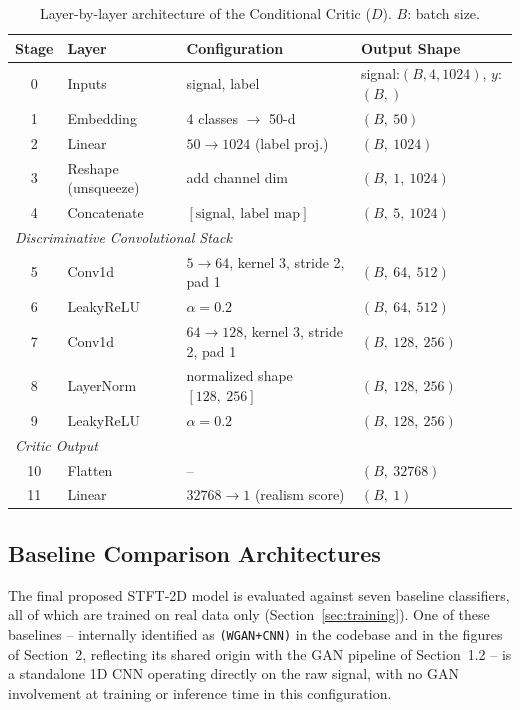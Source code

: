 \documentclass[12pt]{article}
\begin{document}
\begin{table}[H]
\centering
\caption{Layer-by-layer architecture of the Conditional Critic ($D$). $B$: batch size.}
\label{tab:critic}
\begin{tabular}{@{}clll@{}}
\toprule
\textbf{Stage} & \textbf{Layer} & \textbf{Configuration} & \textbf{Output Shape} \\
\midrule
0 & Inputs & signal, label & signal:$(B,4,1024)$, $y$:$(B,)$ \\
1 & Embedding & 4 classes $\to$ 50-d & $(B,\ 50)$ \\
2 & Linear & $50 \to 1024$ (label proj.) & $(B,\ 1024)$ \\
3 & Reshape (unsqueeze) & add channel dim & $(B,\ 1,\ 1024)$ \\
4 & Concatenate & $[\text{signal},\ \text{label map}]$ & $(B,\ 5,\ 1024)$ \\
\midrule
\multicolumn{4}{l}{\textit{Discriminative Convolutional Stack}} \\
5 & Conv1d & $5{\to}64$, kernel 3, stride 2, pad 1 & $(B,\ 64,\ 512)$ \\
6 & LeakyReLU & $\alpha{=}0.2$ & $(B,\ 64,\ 512)$ \\
7 & Conv1d & $64{\to}128$, kernel 3, stride 2, pad 1 & $(B,\ 128,\ 256)$ \\
8 & LayerNorm & normalized shape $[128,\ 256]$ & $(B,\ 128,\ 256)$ \\
9 & LeakyReLU & $\alpha{=}0.2$ & $(B,\ 128,\ 256)$ \\
\midrule
\multicolumn{4}{l}{\textit{Critic Output}} \\
10 & Flatten & -- & $(B,\ 32768)$ \\
11 & Linear & $32768 \to 1$ (realism score) & $(B,\ 1)$ \\
\bottomrule
\end{tabular}
\end{table}

\subsection{Baseline Comparison Architectures}
The final proposed STFT-2D model is evaluated against seven baseline classifiers, all of which are trained on real data only (Section~\ref{sec:training}). One of these baselines -- internally identified as \texttt{(WGAN+CNN)} in the codebase and in the figures of Section~2, reflecting its shared origin with the GAN pipeline of Section~1.2 -- is a standalone 1D CNN operating directly on the raw signal, with no GAN involvement at training or inference time in this configuration.
\end{document}
